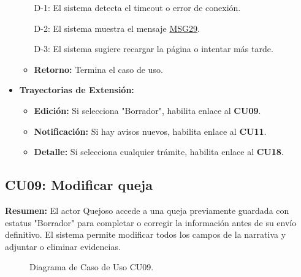 \begin{appendices}
\begin{itemize}[leftmargin=*]
\begin{itemize}[nosep]
        \item[D-1:] El sistema detecta el timeout o error de conexión.
        \item[D-2:] El sistema muestra el mensaje \hyperlink{msg:MSG29}{MSG29}.
        \item[D-3:] El sistema sugiere recargar la página o intentar más tarde.
        \item \textbf{Retorno:} Termina el caso de uso.
    \end{itemize}
    \item \textbf{Trayectorias de Extensión:}
    \begin{itemize}[nosep]
        \item \textbf{Edición:} Si selecciona "Borrador", habilita enlace al \textbf{CU09}.
        \item \textbf{Notificación:} Si hay avisos nuevos, habilita enlace al \textbf{CU11}.
        \item \textbf{Detalle:} Si selecciona cualquier trámite, habilita enlace al \textbf{CU18}.
    \end{itemize}
\end{itemize}

\newpage

\subsection{CU09: Modificar queja}

\textbf{Resumen:} 
El actor Quejoso accede a una queja previamente guardada con estatus "Borrador" para completar o corregir la información antes de su envío definitivo. El sistema permite modificar todos los campos de la narrativa y adjuntar o eliminar evidencias.

\begin{figure}[htbp]
    \centering
    \figCUnueve
    \caption{Diagrama de Caso de Uso CU09.}
    \label{fig:cu09}
\end{figure}


\end{appendices}
